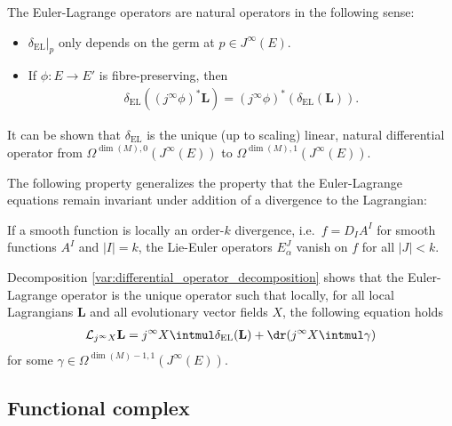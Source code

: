     \begin{property}[Naturality]
        The Euler-Lagrange operators are natural operators in the following sense:
        \begin{itemize}
            \item $\delta_\mathrm{EL}|_p$ only depends on the germ at $p\in J^\infty(E)$.
            \item If $\phi:E\rightarrow E'$ is fibre-preserving, then
                \begin{gather}
                    \label{var:naturality}
                    \delta_\mathrm{EL}((j^\infty\phi)^*\mathbf{L}) = (j^\infty\phi)^*(\delta_\mathrm{EL}(\mathbf{L})).
                \end{gather}
        \end{itemize}
        It can be shown that $\delta_\mathrm{EL}$ is the unique (up to scaling) linear, natural differential operator from $\Omega^{\dim(M),0}(J^\infty(E))$ to $\Omega^{\dim(M),1}(J^\infty(E))$.
    \end{property}

    The following property generalizes the property that the Euler-Lagrange equations remain invariant under addition of a divergence to the Lagrangian:
    \begin{property}[Divergences]\label{var:EL_operator_divergences}
        If a smooth function is locally an order-$k$ divergence, i.e.~$f=D_IA^I$ for smooth functions $A^I$ and $|I|=k$, the Lie-Euler operators $E^J_\alpha$ vanish on $f$ for all $|J|<k$.
    \end{property}

    \begin{property}\label{var:local_variational_formula}
        Decomposition \ref{var:differential_operator_decomposition} shows that the Euler-Lagrange operator is the unique operator such that locally, for all local Lagrangians $\mathbf{L}$ and all evolutionary vector fields $X$, the following equation holds
        \begin{gather}
            \mathcal{L}_{j^\infty X}\mathbf{L} = j^\infty X\intmul\delta_\mathrm{EL}(\mathbf{L}) + \dr(j^\infty X\intmul\gamma)
        \end{gather}
        for some $\gamma\in\Omega^{\dim(M)-1,1}(J^\infty(E))$.
    \end{property}

\subsection{Functional complex}

